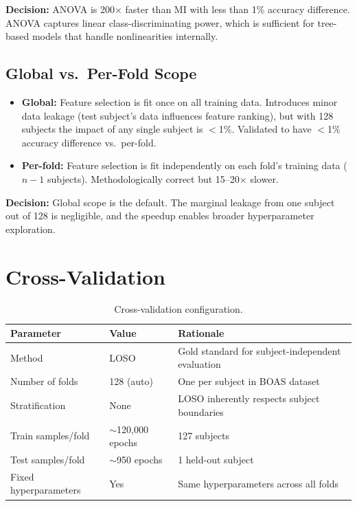 \textbf{Decision:} ANOVA is 200$\times$ faster than MI with less than 1\% accuracy difference. ANOVA captures linear class-discriminating power, which is sufficient for tree-based models that handle nonlinearities internally.

\subsection{Global vs.\ Per-Fold Scope}

\begin{itemize}
    \item \textbf{Global:} Feature selection is fit once on all training data. Introduces minor data leakage (test subject's data influences feature ranking), but with 128 subjects the impact of any single subject is $<$1\%. Validated to have $<$1\% accuracy difference vs.\ per-fold.
    \item \textbf{Per-fold:} Feature selection is fit independently on each fold's training data ($n-1$ subjects). Methodologically correct but 15--20$\times$ slower.
\end{itemize}

\textbf{Decision:} Global scope is the default. The marginal leakage from one subject out of 128 is negligible, and the speedup enables broader hyperparameter exploration.

\section{Cross-Validation}
\label{sec:app_cv}

\begin{table}[h]
\centering
\caption{Cross-validation configuration.}
\label{tab:cv_config}
\begin{tabular}{l l l}
\toprule
\textbf{Parameter} & \textbf{Value} & \textbf{Rationale} \\
\midrule
Method               & LOSO                     & Gold standard for subject-independent evaluation \\
Number of folds      & 128 (auto)               & One per subject in BOAS dataset \\
Stratification       & None                     & LOSO inherently respects subject boundaries \\
Train samples/fold   & $\sim$120{,}000 epochs   & 127 subjects \\
Test samples/fold    & $\sim$950 epochs         & 1 held-out subject \\
Fixed hyperparameters & Yes                     & Same hyperparameters across all folds \\
\bottomrule
\end{tabular}
\end{table}

